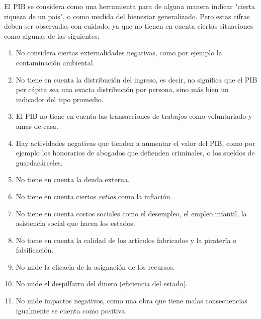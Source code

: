 El PIB se considera como una herramienta para de alguna manera indicar
"cierta riqueza de un país", o como medida del bienestar generalizado.
Pero estas cifras deben ser observadas con cuidado,
ya que no tienen en cuenta ciertas situaciones como algunas de las siguientes:
\begin{enumerate}
    \item No considera ciertas externalidades negativas,
          como por ejemplo la contaminación ambiental.
    \item No tiene en cuenta la distribución del ingreso,
          es decir,
          no significa que el PIB per cápita sea una exacta distribución por persona,
          sino más bien un indicador del tipo promedio.
    \item El PIB no tiene en cuenta las transacciones de trabajos como
          voluntariado y amas de casa.
    \item Hay actividades negativas que tienden a aumentar el valor del PIB,
          como por ejemplo los honorarios de abogados que defienden criminales,
          o los sueldos de guardacárceles.
    \item No tiene en cuenta la deuda externa.
    \item No tiene en cuenta ciertos \textit{ratios} como la inflación.
    \item No tiene en cuenta costos sociales como el desempleo,
          el empleo infantil, la asistencia social que hacen los estados.
    \item No tiene en cuenta la calidad de los artículos fabricados y
          la piratería o falsificación.
    \item No mide la eficacia de la asignación de los recursos.
    \item No mide el despilfarro del dinero (eficiencia del estado).
    \item No mide impactos negativos, como una obra que tiene malas
          consecuencias igualmente se cuenta como positiva.
\end{enumerate}


